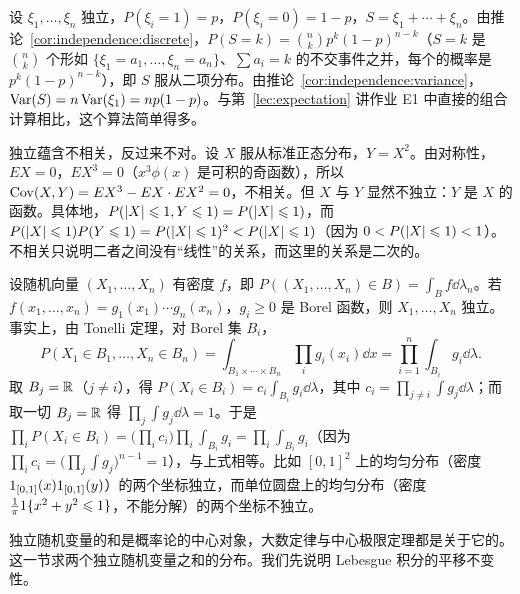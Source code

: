 \begin{example}[二项分布的方差]
设 $\xi_1,\dots,\xi_n$ 独立，$P(\xi_i=1)=p$，$P(\xi_i=0)=1-p$，$S=\xi_1+\cdots+\xi_n$。由推论~\ref{cor:independence:discrete}，$P(S=k)=\binom nkp^k(1-p)^{n-k}$（$S=k$ 是 $\binom nk$ 个形如 $\{\xi_1=a_1,\dots,\xi_n=a_n\}$、$\sum a_i=k$ 的不交事件之并，每个的概率是 $p^k(1-p)^{n-k}$），即 $S$ 服从二项分布。由推论~\ref{cor:independence:variance}，$\operatorname{Var}(S)=n\operatorname{Var}(\xi_1)=np(1-p)$。与第~\ref{lec:expectation} 讲作业 E1 中直接的组合计算相比，这个算法简单得多。
\end{example}

\begin{example}[不相关但不独立]\label{ex:independence:uncorrelated}
独立蕴含不相关，反过来不对。设 $X$ 服从标准正态分布，$Y=X^2$。由对称性，$EX=0$，$EX^3=0$（$x^3\phi(x)$ 是可积的奇函数），所以 $\operatorname{Cov}(X,Y)=EX^3-EX\cdot EX^2=0$，不相关。但 $X$ 与 $Y$ 显然不独立：$Y$ 是 $X$ 的函数。具体地，$P(\lvert X\rvert\leqslant1,Y\leqslant1)=P(\lvert X\rvert\leqslant1)$，而 $P(\lvert X\rvert\leqslant1)P(Y\leqslant1)=P(\lvert X\rvert\leqslant1)^2<P(\lvert X\rvert\leqslant1)$（因为 $0<P(\lvert X\rvert\leqslant1)<1$）。不相关只说明二者之间没有“线性”的关系，而这里的关系是二次的。
\end{example}

\begin{example}[有密度的情形]\label{ex:independence:density}
设随机向量 $(X_1,\dots,X_n)$ 有密度 $f$，即 $P((X_1,\dots,X_n)\in B)=\int_Bf\dd\lambda_n$。若 $f(x_1,\dots,x_n)=g_1(x_1)\cdots g_n(x_n)$，$g_i\geqslant0$ 是 Borel 函数，则 $X_1,\dots,X_n$ 独立。事实上，由 Tonelli 定理，对 Borel 集 $B_i$，
\[
P(X_1\in B_1,\dots,X_n\in B_n)=\int_{B_1\times\cdots\times B_n}\prod_ig_i(x_i)\dd x=\prod_{i=1}^n\int_{B_i}g_i\dd\lambda .
\]
取 $B_j=\mathbb{R}$（$j\neq i$），得 $P(X_i\in B_i)=c_i\int_{B_i}g_i\dd\lambda$，其中 $c_i=\prod_{j\neq i}\int g_j\dd\lambda$；而取一切 $B_j=\mathbb{R}$ 得 $\prod_j\int g_j\dd\lambda=1$。于是 $\prod_iP(X_i\in B_i)=\bigl(\prod_ic_i\bigr)\prod_i\int_{B_i}g_i=\prod_i\int_{B_i}g_i$（因为 $\prod_ic_i=\bigl(\prod_j\int g_j\bigr)^{n-1}=1$），与上式相等。比如 $[0,1]^2$ 上的均匀分布（密度 $1_{[0,1]}(x)1_{[0,1]}(y)$）的两个坐标独立，而单位圆盘上的均匀分布（密度 $\frac1\pi1\{x^2+y^2\leqslant1\}$，不能分解）的两个坐标不独立。
\end{example}


独立随机变量的和是概率论的中心对象，大数定律与中心极限定理都是关于它的。这一节求两个独立随机变量之和的分布。我们先说明 Lebesgue 积分的平移不变性。

